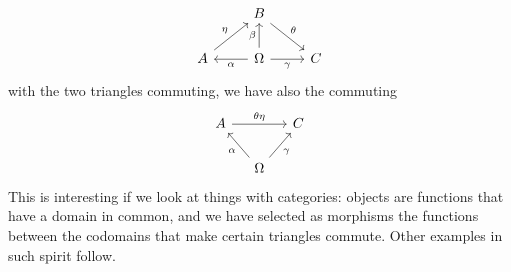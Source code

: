 \begin{example}
\[\begin{tikzcd}
& B \ar["\theta", dr] & \\
A \ar["\eta", ur] & \Omega \ar["\alpha", l] \ar["\beta", u] \ar["\gamma", r, swap] & C
\end{tikzcd}\]
with the two triangles commuting, we have also the commuting
\[\begin{tikzcd}[column sep=small]
A \ar["\theta\eta", rr] & & C \\
& \Omega \ar["\alpha", ul] \ar["\gamma", ur, swap]
\end{tikzcd}\]
This is interesting if we look at things with categories: objects are functions that have a domain in common, and we have selected as morphisms the functions between the codomains that make certain triangles commute. Other examples in such spirit follow.
\end{example}


